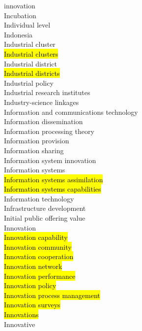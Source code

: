 \documentclass[a4paper]{article}
\begin{document}
\begin{multicols*}{2}
\begin{footnotesize}
innovation \\ Incubation \\ Individual level \\ Indonesia \\ Industrial cluster \\ \hl{Industrial clusters} \\ Industrial district \\ \hl{Industrial districts} \\ Industrial policy \\ Industrial research institutes \\ Industry-science linkages \\ Information and communications technology \\ Information dissemination \\ Information processing theory \\ Information provision \\ Information sharing \\ Information system innovation \\ Information systems \\ \hl{Information systems assimilation} \\ \hl{Information systems capabilities} \\ Information technology \\ Infrastructure development \\ Initial public offering value \\ Innovation \\ \hl{Innovation capability} \\ \hl{Innovation community} \\ \hl{Innovation cooperation} \\ \hl{Innovation network} \\ \hl{Innovation performance} \\ \hl{Innovation policy} \\ \hl{Innovation process management} \\ \hl{Innovation surveys} \\ \hl{Innovations} \\ Innovative 
\end{footnotesize}
\end{multicols*}
\end{document}
